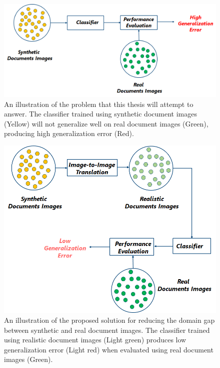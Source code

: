 \vspace*{2cm}
\begin{figure}[H]
        \begin{center}
	    \includegraphics[scale=0.60]{images/Introduction/Problem.png}
	    \caption[An illustration of the problem that this thesis will attempt to answer.]{An illustration of the problem that this thesis will attempt to answer. The classifier trained using synthetic document images (Yellow) will not generalize well on real document images (Green), producing high generalization error (Red).}
	    \label{fig:Problem}
	    \end{center}
\end{figure}

\vspace*{4cm}
\begin{figure}[H]
        \begin{center}
	    \includegraphics[scale=0.70]{images/Introduction/ProposedSolution.png}
	    \caption[An illustration of the proposed solution for reducing the domain gap between synthetic and real document images.]{An illustration of the proposed solution for reducing the domain gap between synthetic and real document images. The classifier trained using realistic document images (Light green) produces low generalization error (Light red) when evaluated using real document images (Green).}
	    \label{fig:ProposedSolution}
	    \end{center}
\end{figure}




